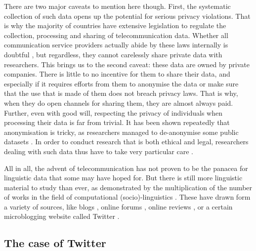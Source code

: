 \documentclass[../thesis.tex]{subfiles}
\begin{document}
There are two major caveats to mention here though. First, the systematic collection of
such data opens up the potential for serious privacy violations. That is why the
majority of countries have extensive legislation to regulate the collection, processing
and sharing of telecommunication data. Whether all communication service providers
actually abide by these laws internally is doubtful
\cite{GDPREnforcement,GDPRFines2023}, but regardless, they cannot carelessly share
private data with researchers. This brings us to the second caveat: these data are owned
by private companies. There is little to no incentive for them to share their data, and
especially if it requires efforts from them to anonymise the data or make sure that the
use that is made of them does not breach privacy laws. That is why, when they do open
channels for sharing them, they are almost always paid. Further, even with good will,
respecting the privacy of individuals when processing their data is far from trivial. It
has been shown repeatedly that anonymisation is tricky, as researchers managed
to de-anonymise some public datasets
\cite{NarayananRobustDeanonymization2008,GambsDeanonymizationAttack2014}. In order to
conduct research that is both ethical and legal, researchers dealing with such data thus
have to take very particular care \cite{OhmBrokenPromises2009a,KulkBraveNew2012}.

All in all, the advent of telecommunication has not proven to be the panacea for
linguistic data that some may have hoped for. But there is still more linguistic
material to study than ever, as demonstrated by the multiplication of the number of
works in the field of computational (socio)-linguistics
\cite{NguyenComputationalSociolinguistics2016}. These have drawn form a variety of
sources, like blogs \cite{NguyenAuthorAge2011,SchlerEffectsAge2006}, online forums
\cite{BaruaWhatAre2014,GarleyBeefmovesDissemination2012,NguyenAuthorAge2011}, online
reviews
\cite{HovyUserReview2015,Danescu-Niculescu-MizilNoCountry2013,OtterbacherInferringGender2010},
or a certain microblogging website called Twitter \cite{MocanuTwitterBabel2013,AlshaabiStorywranglerMassive2021,CodyClimateChange2015,ZamalHomophilyLatent2012,LiaoLifetimeLexical2014}.


\subsection{The case of Twitter}
\end{document}
